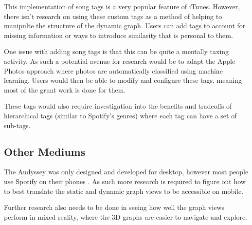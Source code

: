 This implementation of song tags is a very popular feature of iTunes. However, there isn't research on using these custom tags as a method of helping to manipulte the structure of the dynamic graph. Users can add tags to account for missing information or ways to introduce similarity that is personal to them.

One issue with adding song tags is that this can be quite a mentally taxing activity. As such a potential avenue for research would be to adapt the Apple Photos approach where photos are automatically classified using machine learning. Users would then be able to modify and configure these tags, meaning most of the grunt work is done for them.

These tags would also require investigation into the benefits and tradeoffs of hierarchical tags (similar to Spotify's genres) where each tag can have a set of sub-tags.


\subsection{Other Mediums}
The Audyssey was only designed and developed for desktop, however most people use Spotify on their phones \cite{}. As such more research is required to figure out how to best translate the static and dynamic graph views to be accessible on mobile.

Further research also needs to be done in seeing how well the graph views perform in mixed reality, where the 3D graphs are easier to navigate and explore.